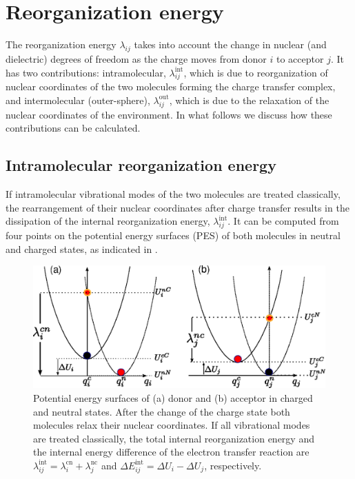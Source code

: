 \section{Reorganization energy}
\label{sec:reorganization}

The reorganization energy $\lambda_{ij}$ takes into account the change in  nuclear (and dielectric) degrees of freedom as the charge moves from donor $i$ to acceptor $j$. It has two contributions: intramolecular, $\lambda^\text{int}_{ij}$, which is due to reorganization of nuclear coordinates of the two molecules forming the charge transfer complex, and intermolecular (outer-sphere), $\lambda^\text{out}_{ij}$, which is due to the relaxation of the nuclear coordinates of the environment. In what follows we discuss how these contributions can be calculated.

\subsection{Intramolecular reorganization energy}
\label{sec:inner_reorganization}
If intramolecular vibrational modes of the two molecules are treated classically, the rearrangement of their nuclear coordinates after charge transfer results in the dissipation of the internal reorganization energy, $\lambda_{ij}^\text{int}$. It can be computed from four points on the potential energy surfaces (PES) of both molecules in neutral and charged states, as indicated in . 

\begin{figure}
   \includegraphics[width=\linewidth]{fig/reorganization_energy/monomer_parabolas}
    \caption{Potential energy surfaces of (a) donor and (b) acceptor in charged and neutral states. After the change of the charge state both molecules relax their nuclear coordinates. If all vibrational modes are treated classically, the total internal reorganization energy and the internal energy difference of the electron transfer reaction are $\lambda_{ij}^\text{int} = \lambda_{i}^\text{cn} + \lambda_{j}^\text{nc}$ and $\Delta E_{ij}^\text{int} =  \Delta U_i - \Delta U_j$, respectively.}
   \label{fig:parabolas}
\end{figure}


